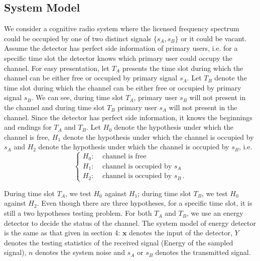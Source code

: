\subsection{System Model}
We consider a cognitive radio system where the licensed frequency spectrum could be occupied by one of two distinct signals $\{s_A, s_B\}$ or it could be vacant. 
Assume the detector has perfect side information of primary users, i.e. for a specific time slot the detector knows which primary user could occupy the channel. For easy presentation, let $T_A$ presents the time slot during which the channel can be either free or occupied by primary signal $s_A$. Let $T_B$ denote the time slot during which the channel can be either free or occupied by primary signal $s_B$. We can see, during time slot $T_A$, primary user $s_B$ will not present in the channel and during time slot $T_B$ primary user $s_A$ will not present in the channel. Since the detector has perfect side information, it knows the beginnings and endings for $T_A$ and $T_B$. Let $H_0$ denote the hypothesis under which the channel is free,  $H_1$ denote the hypothesis under which the channel is occupied by $s_A$ and $H_2$ denote the hypothesis under which the channel is occupied by $s_B$, i.e.
\begin{equation}
\begin{cases}
H_0:\;\;\;\;\text{channel is free}\\
H_1:\;\;\;\;\text{channel is occupied by $s_A$}\\
H_2:\;\;\;\;\text{channel is occupied by $s_B$}\,.
\end{cases}
\end{equation} 

During time slot $T_A$, we  test $H_0$ against $H_1$; during time slot $T_B$, we test $H_0$ against $H_2$. 
Even though there are three hypotheses, for a specific time slot, it is still a two hypotheses testing problem.   
For both $T_A$ and $T_B$, we use an energy detector to decide the status of the channel. 
The system model of energy detector is the same as that given in section 4: $\mathbf{x}$ denotes the input of the detector, $Y$ denotes the testing statistics of the received signal (Energy of the sampled signal), $n$ denotes the system noise and $s_A$ or $s_B$ denotes the transmitted signal. 

